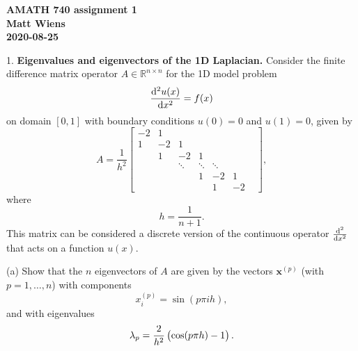 \documentclass{article}
\def\*#1{\mathbf{#1}}
\newcommand{\R}{\mathbb{R}}
\begin{document}
\textbf{AMATH 740 assignment 1} \\
\textbf{Matt Wiens} \\
\textbf{2020-08-25}

1. \textbf{Eigenvalues and eigenvectors of the 1D Laplacian.}
Consider the finite difference matrix operator $A \in \R^{n \times n}$ for the 1D model problem
%
\begin{equation*}
    \dod[2]{u(x)}{x} = f(x)
\end{equation*}
%
on domain $[0, 1]$ with boundary conditions $u(0) = 0$ and $u(1) = 0$,
given by
%
\begin{equation*}
    A = \frac{1}{h^2}
        \begin{bmatrix}
            -2 & 1 & & & & & \\
            1 & -2 & 1 & & & \\
              & 1 & -2 & 1 & & \\
              & & \ddots & \ddots & \ddots & \\
              & & & 1 & -2 & 1 \\
              & & & & 1 & -2
         \end{bmatrix}
         ,
\end{equation*}
%
where
%
\begin{equation*}
    h = \frac{1}{n + 1}
    .
\end{equation*}
%
This matrix can be considered a discrete version of the continuous operator
$\od[2]{}{x}$ that acts on a function $u(x)$.

(a) Show that the $n$ eigenvectors of $A$ are given by the vectors
$\*x^{(p)}$ (with $p = 1, \ldots, n$) with components
%
\begin{equation*}
    x_i^{(p)} = \sin(p \pi i h),
\end{equation*}
%
and with eigenvalues
%
\begin{equation*}
    \lambda_p = \frac{2}{h^2} \del{\cos(p \pi h) - 1}
    .
\end{equation*}
\end{document}
